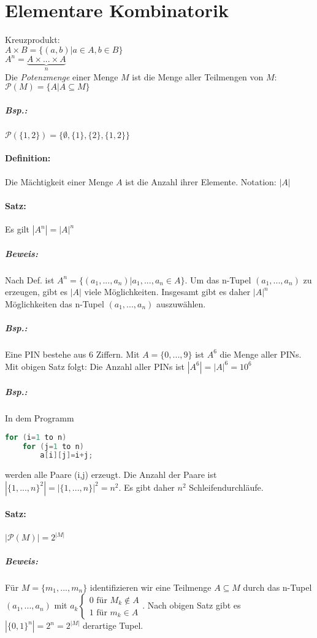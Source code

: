 \section{Elementare Kombinatorik}

Kreuzprodukt:\\
$A\times B = \{(a,b)|a \in A, b \in B\}$\\
$A^n=\underbrace{A\times ... \times A}_{n}$\\
Die \emph{Potenzmenge} einer Menge $M$ ist die Menge aller Teilmengen von $M$:
$\mathcal{P}(M)=\{A|A\subseteq M\}$
\subparagraph{Bsp.:} $\mathcal{P}(\{1,2\})=\{\emptyset, \{1\}, \{2\}, \{1,2\}\}$

\paragraph{Definition:} Die Mächtigkeit einer Menge $A$ ist die Anzahl ihrer Elemente. Notation: $|A|$

\paragraph{Satz:} Es gilt $|A^n|=|A|^n$
\subparagraph{Beweis:} 
Nach Def. ist $A^n=\{(a_1,...,a_n)|a_1,...,a_n \in A\}$. Um das n-Tupel $(a_1,...,a_n)$ zu erzeugen, gibt es $|A|$ viele Möglichkeiten. Insgesamt gibt es daher $|A|^n$ Möglichkeiten das n-Tupel $(a_1,...,a_n)$ auszuwählen.

\subparagraph{Bsp.:} Eine PIN bestehe aus 6 Ziffern. Mit $A=\{0,...,9\}$ ist $A^6$ die Menge aller PINs. Mit obigen Satz folgt: Die Anzahl aller PINs ist $|A^6|=|A|^6 = 10^6$

\subparagraph{Bsp.:} In dem Programm
\begin{lstlisting}[language=C]
for (i=1 to n)
	for (j=1 to n)
		a[i][j]=i+j;
\end{lstlisting}
werden alle Paare (i,j) erzeugt. Die Anzahl der Paare ist $|\{1,...,n\}^2|=|\{1,...,n\}|^2=n^2$. Es gibt daher $n^2$ Schleifendurchläufe.

\paragraph{Satz:} $|\mathcal{P}(M)|=2^{|M|}$
\subparagraph{Beweis:} Für $M=\{m_1, ...,m_n\}$ identifizieren wir eine Teilmenge $A\subseteq M$ durch das n-Tupel $(a_1, ..., a_n)$ mit $a_k\begin{cases}0\text{ für }M_k \not \in A\\ 1\text{ für }m_k \in A\end{cases}$. Nach obigen Satz gibt es $|\{0,1\}^n|=2^n=2^{|M|}$ derartige Tupel.

